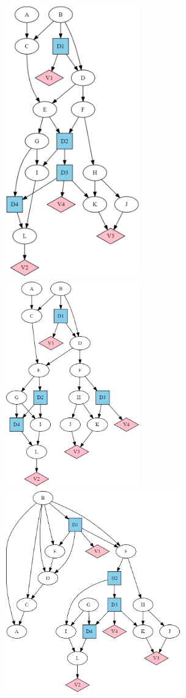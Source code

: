 \begin{itemize}
\begin{figure}[h!]
\centering
\includegraphics[width=2.3in]{influ-diag/sha-fig1.png}
\includegraphics[width=2.3in]{influ-diag/sha-fig3.png}
\includegraphics[width=3in]{influ-diag/sha-fig4.png}

\end{figure}
\end{itemize}
